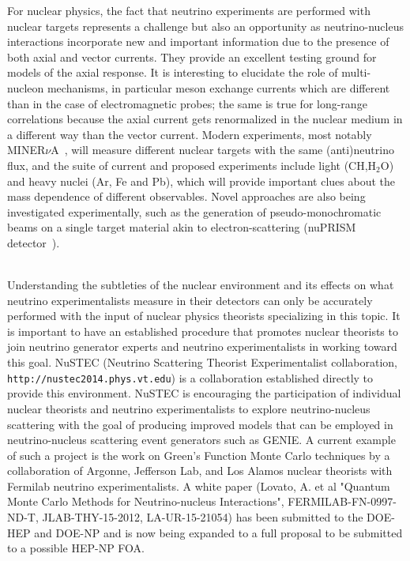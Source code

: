 For nuclear physics, the fact that neutrino experiments are performed with nuclear targets represents a challenge but also an opportunity as neutrino-nucleus interactions incorporate new and important information due to the presence of both  axial and vector currents. They provide an excellent testing ground for models of the axial response. It is interesting to elucidate the role of multi-nucleon mechanisms, in particular meson exchange currents which are different than in the case of electromagnetic probes; the same is true for long-range correlations because the axial current gets renormalized in the nuclear medium in a different way than the vector current. Modern experiments, most notably MINER$\nu$A~\cite{Tice:2014pgu}, will measure different nuclear targets with the same (anti)neutrino flux, and the suite of current and proposed experiments include light (CH,H$_2$O) and heavy nuclei (Ar, Fe and Pb), which will provide important clues about the mass dependence of different observables. Novel approaches are also being investigated experimentally, such as the generation of pseudo-monochromatic beams on a single target material akin to electron-scattering (nuPRISM detector~\cite{Bhadra:2014oma}).

\\Understanding the subtleties of the nuclear environment and its effects on what neutrino experimentalists measure in their detectors can only be accurately performed with the input of nuclear physics theorists specializing in this topic. It is important to have an established  procedure that promotes nuclear theorists to join neutrino generator experts and neutrino experimentalists in working toward this goal. NuSTEC (Neutrino Scattering Theorist Experimentalist collaboration, {\tt http://nustec2014.phys.vt.edu}) is a collaboration established directly to provide this environment.  NuSTEC is encouraging the participation of individual nuclear theorists and neutrino experimentalists to explore neutrino-nucleus scattering with the goal of producing improved models that can be employed in neutrino-nucleus scattering event generators such as GENIE.  A current example of such a project is the work on Green's Function Monte Carlo techniques by a collaboration of Argonne, Jefferson Lab, and Los Alamos nuclear theorists with Fermilab neutrino experimentalists.  A white paper (Lovato, A. et al "Quantum Monte Carlo Methods for Neutrino-nucleus Interactions", FERMILAB-FN-0997-ND-T, JLAB-THY-15-2012, LA-UR-15-21054) has been submitted to the DOE-HEP and DOE-NP and is now being expanded to a full proposal to be submitted to a possible HEP-NP FOA.
 
